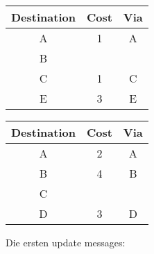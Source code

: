 \documentclass[a4paper,
			llpt,
			solution,
			accentcolor=tud2d,
			colorbacktitle
			]
			{tudexercise}
\newcommand{\8}{$\infty$}
\begin{document}
\begin{multicols}{3}
\begin{tabular}{c|c|c}
\end{tabular}
\begin{tabular}{c|c|c}
Destination & Cost & Via \\ \hline
A           & 1    & A   \\
B           &      &     \\
C           & 1    & C   \\
E           & 3    & E   \\
\end{tabular}
\begin{tabular}{c|c|c}
Destination & Cost & Via \\ \hline
A           & 2    & A   \\
B           & 4    & B   \\
C           &      &     \\
D           & 3    & D   \\
\end{tabular}
\end{multicols}
Die ersten update messages:
\end{document}
